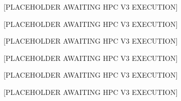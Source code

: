 
[PLACEHOLDER AWAITING HPC V3 EXECUTION]

[PLACEHOLDER AWAITING HPC V3 EXECUTION]

[PLACEHOLDER AWAITING HPC V3 EXECUTION]

[PLACEHOLDER AWAITING HPC V3 EXECUTION]

[PLACEHOLDER AWAITING HPC V3 EXECUTION]

[PLACEHOLDER AWAITING HPC V3 EXECUTION]
